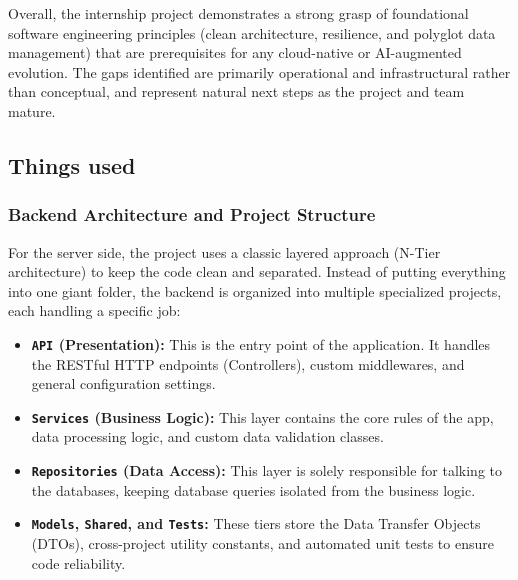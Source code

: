 \noindent
Overall, the internship project demonstrates a strong grasp of
foundational software engineering principles (clean architecture,
resilience, and polyglot data management) that are prerequisites for
any cloud-native or AI-augmented evolution.
The gaps identified are primarily operational and infrastructural
rather than conceptual, and represent natural next steps as the
project and team mature.



\subsection{Things used}
\subsubsection{Backend Architecture and Project Structure}
For the server side, the project uses a classic layered approach (N-Tier architecture) to keep the code clean and separated. Instead of putting everything into one giant folder, the backend is organized into multiple specialized projects, each handling a specific job:
\begin{itemize}
    \item \textbf{\texttt{API} (Presentation):} This is the entry point of the application. It handles the RESTful HTTP endpoints (Controllers), custom middlewares, and general configuration settings.
    \item \textbf{\texttt{Services} (Business Logic):} This layer contains the core rules of the app, data processing logic, and custom data validation classes.
    \item \textbf{\texttt{Repositories} (Data Access):} This layer is solely responsible for talking to the databases, keeping database queries isolated from the business logic.
    \item \textbf{\texttt{Models}, \texttt{Shared}, and \texttt{Tests}:} These tiers store the Data Transfer Objects (DTOs), cross-project utility constants, and automated unit tests to ensure code reliability.
\end{itemize}

